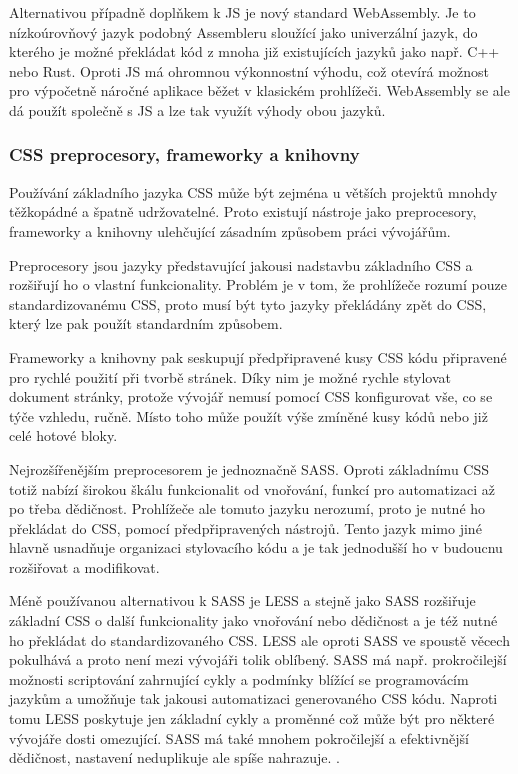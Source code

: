 		Alternativou případně doplňkem k \ac{JS} je nový standard WebAssembly.
		Je to nízkoúrovňový jazyk podobný Assembleru sloužící jako univerzální jazyk, do kterého je možné překládat
		kód z mnoha již existujících jazyků jako např. C++ nebo Rust.
		Oproti \ac{JS} má ohromnou výkonnostní výhodu, což otevírá možnost pro výpočetně náročné aplikace běžet
		v klasickém prohlížeči.
		WebAssembly se ale dá použít společně s \ac{JS} a lze tak využít výhody obou jazyků. \cite{webassembly}

		\subsubsection{CSS preprocesory, frameworky a knihovny}

		Používání základního jazyka \Ac{CSS} může být zejména u větších projektů mnohdy těžkopádné a špatně udržovatelné.
		Proto existují nástroje jako preprocesory, frameworky a knihovny ulehčující zásadním způsobem práci vývojářům.

		Preprocesory jsou jazyky představující jakousi nadstavbu základního \Ac{CSS} a rozšiřují ho o vlastní
		funkcionality.
		Problém je v tom, že prohlížeče rozumí pouze standardizovanému \Ac{CSS}, proto musí být tyto jazyky překládány
		zpět do \Ac{CSS}, který lze pak použít standardním způsobem.

		Frameworky a knihovny pak seskupují předpřipravené kusy \Ac{CSS} kódu připravené pro rychlé použití při tvorbě stránek.
		Díky nim je možné rychle stylovat dokument stránky, protože vývojář nemusí pomocí \Ac{CSS} konfigurovat vše, co se
		týče vzhledu, ručně.
		Místo toho může použít výše zmíněné kusy kódů nebo již celé hotové bloky.

		Nejrozšířenějším preprocesorem je jednoznačně \Ac{SASS}.
		Oproti základnímu \Ac{CSS} totiž nabízí širokou škálu funkcionalit od vnořování, funkcí pro automatizaci až po třeba
		dědičnost.
		Prohlížeče ale tomuto jazyku nerozumí, proto je nutné ho překládat do \Ac{CSS}, pomocí předpřipravených nástrojů.
		Tento jazyk mimo jiné hlavně usnadňuje organizaci stylovacího kódu a je tak jednodušší ho v budoucnu rozšiřovat a
		modifikovat. \cite{learn_sass}

		Méně používanou alternativou k \Ac{SASS} je \Ac{LESS} a stejně jako \Ac{SASS} rozšiřuje základní \Ac{CSS}
		o další funkcionality jako vnořování nebo dědičnost a je též nutné ho překládat do standardizovaného \Ac{CSS}. \cite{less_overview}
		\Ac{LESS} ale oproti \Ac{SASS} ve spoustě věcech pokulhává a proto není mezi vývojáři tolik oblíbený.
		\Ac{SASS} má např. prokročilejší možnosti scriptování zahrnující cykly a podmínky blížící se programovácím jazykům
		a umožňuje tak jakousi automatizaci generovaného \Ac{CSS} kódu.
		Naproti tomu \Ac{LESS} poskytuje jen základní cykly a proměnné což může být pro některé vývojáře dosti omezující.
		\Ac{SASS} má také mnohem pokročilejší a efektivnější dědičnost, nastavení neduplikuje ale spíše nahrazuje. \cite{sass_vs_less}.

